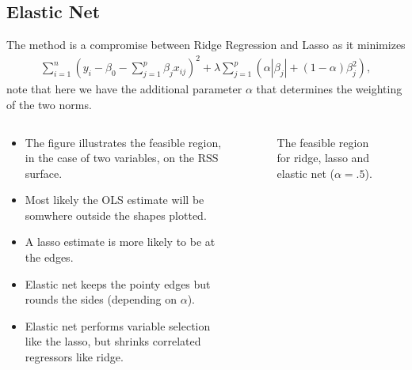 \documentclass[aspectratio=169,10pt]{beamer}
\begin{document}
\subsection{Elastic Net}
\begin{frame}{\secname}{\subsecname}
  The method is a compromise between Ridge Regression and Lasso as it minimizes
  \begin{align*}
    \sum_{i=1}^n \left( y_i - \beta_0 - \sum_{j=1}^p \beta_j x_{ij}\right)^2 + \lambda \sum_{j=1}^p \left(\alpha |\beta_j| + (1 - \alpha)\beta_j^2\right),
  \end{align*}
  note that here we have the additional parameter $\alpha$ that determines the weighting of the two norms.
\end{frame}

\begin{frame}{\secname}{\subsecname}
  \begin{columns}
    \begin{column}{.5\textwidth}
      \begin{itemize}
        \item The figure illustrates the feasible region, in the case of two variables, on the RSS surface.
        \item Most likely the OLS estimate will be somwhere outside the shapes plotted.
        \item A lasso estimate is more likely to be at the edges.
        \item Elastic net keeps the pointy edges but rounds the sides (depending on $\alpha$).
        \item Elastic net performs variable selection like the lasso, but shrinks correlated regressors like ridge.
      \end{itemize}
    \end{column}
    \begin{column}{.5\textwidth}
      \begin{figure}
        \centering
        \caption{The feasible region for {\color{violet} ridge}, {\color{orange} lasso} and {\color{teal} elastic net} ($\alpha = .5$).}
      \end{figure}
    \end{column}
  \end{columns}
\end{frame}
\end{document}
